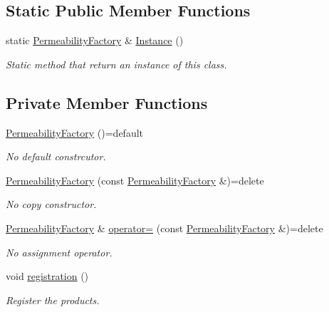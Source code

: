 \subsection*{Static Public Member Functions}
\begin{DoxyCompactItemize}
\item 
static \hyperlink{classFVCode3D_1_1PermeabilityFactory}{Permeability\+Factory} \& \hyperlink{classFVCode3D_1_1PermeabilityFactory_a4bf654c1bec870030dbfe0a8dfbc721e}{Instance} ()
\begin{DoxyCompactList}\small\item\em Static method that return an instance of this class. \end{DoxyCompactList}\end{DoxyCompactItemize}
\subsection*{Private Member Functions}
\begin{DoxyCompactItemize}
\item 
\hyperlink{classFVCode3D_1_1PermeabilityFactory_a4d493147f170220c876247c000ea57a7}{Permeability\+Factory} ()=default
\begin{DoxyCompactList}\small\item\em No default constrcutor. \end{DoxyCompactList}\item 
\hyperlink{classFVCode3D_1_1PermeabilityFactory_aa6cf697c0fe79de326e42a3e1f6ed392}{Permeability\+Factory} (const \hyperlink{classFVCode3D_1_1PermeabilityFactory}{Permeability\+Factory} \&)=delete
\begin{DoxyCompactList}\small\item\em No copy constructor. \end{DoxyCompactList}\item 
\hyperlink{classFVCode3D_1_1PermeabilityFactory}{Permeability\+Factory} \& \hyperlink{classFVCode3D_1_1PermeabilityFactory_a0f37ae69832f386ad197f95f81825eb3}{operator=} (const \hyperlink{classFVCode3D_1_1PermeabilityFactory}{Permeability\+Factory} \&)=delete
\begin{DoxyCompactList}\small\item\em No assignment operator. \end{DoxyCompactList}\item 
void \hyperlink{classFVCode3D_1_1PermeabilityFactory_a6aad35b4bccce3c7aea9ed49c1739e5d}{registration} ()
\begin{DoxyCompactList}\small\item\em Register the products. \end{DoxyCompactList}\end{DoxyCompactItemize}
